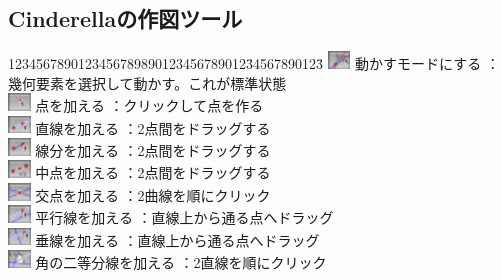 \documentclass[papersize,a4paper,12pt,uplatex]{jsarticle}
\begin{document}
\subsection{Cinderellaの作図ツール}
 \begin{tabbing}
1234567890123456789890123456789012\=34567890123\=\kill
\includegraphics[bb=0 0 6.48 5.04 , width=0.6cm]{Fig/move.pdf}    動かすモードにする \>：幾何要素を選択して動かす。これが標準状態\\
\includegraphics[bb=0 0 6.48 5.04 , width=0.6cm]{Fig/single-add.pdf}    点を加える   \>：クリックして点を作る\\
\includegraphics[bb=0 0 6.48 5.04 , width=0.6cm]{Fig/multi-add-line.pdf}    直線を加える   \>：2点間をドラッグする\\
\includegraphics[bb=0 0 6.48 5.04 , width=0.6cm]{Fig/segment.pdf}    線分を加える   \>：2点間をドラッグする\\
\includegraphics[bb=0 0 6.48 5.04 , width=0.6cm]{Fig/middle.pdf}    中点を加える   \>：2点間をドラッグする\\
\includegraphics[bb=0 0 6.48 5.04 , width=0.6cm]{Fig/intersection.pdf}    交点を加える   \>：2曲線を順にクリック\\
\includegraphics[bb=0 0 6.48 5.04 , width=0.6cm]{Fig/multi-add-parallel.pdf}    平行線を加える   \>：直線上から通る点へドラッグ\\
\includegraphics[bb=0 0 6.48 5.04 , width=0.6cm]{Fig/multi-add-perp.pdf}    垂線を加える   \>：直線上から通る点へドラッグ\\
\includegraphics[bb=0 0 6.48 5.04 , width=0.6cm]{Fig/bisector.pdf}    角の二等分線を加える   \>：2直線を順にクリック\\

\end{tabbing}
\end{document}
